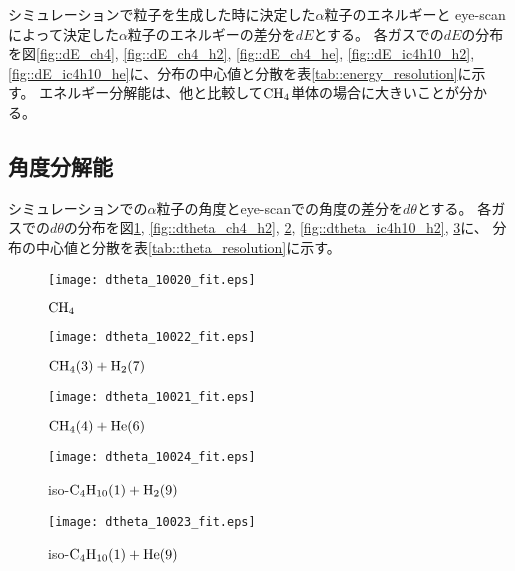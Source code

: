\documentclass[../master]{subfiles}
\begin{document}
シミュレーションで粒子を生成した時に決定した$\alpha$粒子のエネルギーと
eye-scanによって決定した$\alpha$粒子のエネルギーの差分を$dE$とする。
各ガスでの$dE$の分布を図\ref{fig::dE_ch4}, \ref{fig::dE_ch4_h2}, \ref{fig::dE_ch4_he},
\ref{fig::dE_ic4h10_h2}, \ref{fig::dE_ic4h10_he}に、分布の中心値と分散を表\ref{tab::energy_resolution}に示す。
エネルギー分解能は、他と比較して$\rm CH_{4}$単体の場合に大きいことが分かる。

\subsection{角度分解能}
シミュレーションでの$\alpha$粒子の角度とeye-scanでの角度の差分を$d\theta$とする。
各ガスでの$d\theta$の分布を図\ref{fig::dtheta_ch4}, \ref{fig::dtheta_ch4_h2}, \ref{fig::dtheta_ch4_he},
\ref{fig::dtheta_ic4h10_h2}, \ref{fig::dtheta_ic4h10_he}に、
分布の中心値と分散を表\ref{tab::theta_resolution}に示す。
\begin{figure}
  \centering
  \begin{minipage}{0.45\columnwidth}
    \centering
    \texttt{[image: dtheta\_10020\_fit.eps]}
    \caption{$\rm CH_{4}$}
    \label{fig::dtheta_ch4}
  \end{minipage}  
\end{figure}
\begin{figure}
  \centering
  \begin{minipage}{0.45\columnwidth}
    \centering
    \texttt{[image: dtheta\_10022\_fit.eps]}
    \caption{$\rm CH_{4} (3) + H_{2} (7)$}
    \label{fig::dtheta_ch4_h2}
  \end{minipage}
  \begin{minipage}{0.45\columnwidth}
    \centering
    \texttt{[image: dtheta\_10021\_fit.eps]}
    \caption{$\rm CH_{4} (4) + He (6)$}
    \label{fig::dtheta_ch4_he}
  \end{minipage}
\end{figure}
\begin{figure}
  \centering
  \begin{minipage}{0.45\columnwidth}
    \centering
    \texttt{[image: dtheta\_10024\_fit.eps]}
    \caption{iso-$\rm C_{4}H_{10} (1) + H_{2} (9)$}
    \label{fig::dtheta_ic4h10_h2}
  \end{minipage}
  \begin{minipage}{0.45\columnwidth}
    \centering
    \texttt{[image: dtheta\_10023\_fit.eps]}
    \caption{iso-$\rm C_{4}H_{10} (1) + He (9)$}
    \label{fig::dtheta_ic4h10_he}
  \end{minipage}
\end{figure}
\end{document}
